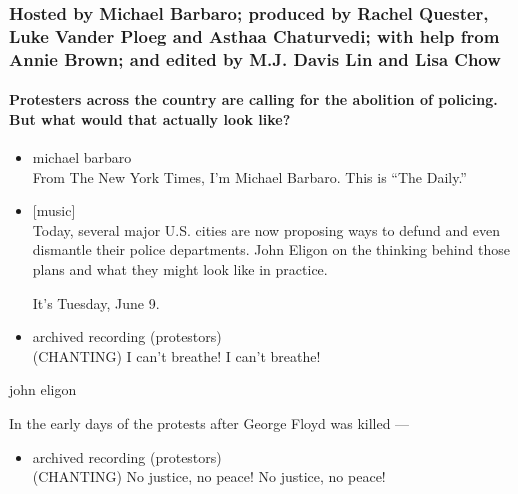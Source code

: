 \hypertarget{hosted-by-michael-barbaro-produced-by-rachel-quester-luke-vander-ploeg-and-asthaa-chaturvedi-with-help-from-annie-brown-and-edited-by-mj-davis-lin-and-lisa-chow}{%
\subsubsection{Hosted by Michael Barbaro; produced by Rachel Quester,
Luke Vander Ploeg and Asthaa Chaturvedi; with help from Annie Brown; and
edited by M.J. Davis Lin and Lisa
Chow}\label{hosted-by-michael-barbaro-produced-by-rachel-quester-luke-vander-ploeg-and-asthaa-chaturvedi-with-help-from-annie-brown-and-edited-by-mj-davis-lin-and-lisa-chow}}

\hypertarget{protesters-across-the-country-are-calling-for-the-abolition-of-policing-but-what-would-that-actually-look-like}{%
\paragraph{Protesters across the country are calling for the abolition
of policing. But what would that actually look
like?}\label{protesters-across-the-country-are-calling-for-the-abolition-of-policing-but-what-would-that-actually-look-like}}

\begin{itemize}
\item
  michael barbaro\\
  From The New York Times, I'm Michael Barbaro. This is ``The Daily.''
\item
  {[}music{]}\\
  Today, several major U.S. cities are now proposing ways to defund and
  even dismantle their police departments. John Eligon on the thinking
  behind those plans and what they might look like in practice.

  It's Tuesday, June 9.
\item
  archived recording (protestors)\\
  (CHANTING) I can't breathe! I can't breathe!
\end{itemize}

john eligon

In the early days of the protests after George Floyd was killed ---

\begin{itemize}
\tightlist
\item
  archived recording (protestors)\\
  (CHANTING) No justice, no peace! No justice, no peace!
\end{itemize}

